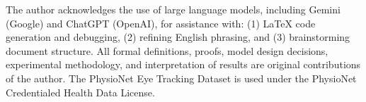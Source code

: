 \documentclass[sigconf]{acmart}
\theoremstyle{plain}
\theoremstyle{definition}
\begin{document}
\begin{acks}
The author acknowledges the use of large language models, including Gemini (Google) and ChatGPT (OpenAI), for assistance with:
(1) \LaTeX{} code generation and debugging,
(2) refining English phrasing, and
(3) brainstorming document structure.
All formal definitions, proofs, model design decisions, experimental methodology, and interpretation of results are original contributions of the author.
The PhysioNet Eye Tracking Dataset is used under the PhysioNet Credentialed Health Data License.
\end{acks}


\end{document}
